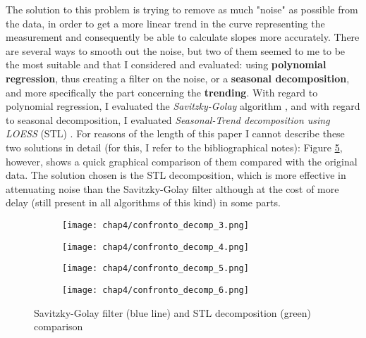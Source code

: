 The solution to this problem is trying to remove as much "noise" as possible from the data, in order to get a more linear trend in the curve representing the measurement and consequently be able to calculate slopes more accurately.\newline
There are several ways to smooth out the noise, but two of them seemed to me to be the most suitable and that I considered and evaluated: using \textbf{polynomial regression}, thus creating a filter on the noise, or a \textbf{seasonal decomposition}, and more specifically the part concerning the \textbf{trending}.\newline
With regard to polynomial regression, I evaluated the \textit{Savitzky-Golay} algorithm \cite{savgol}, and with regard to seasonal decomposition, I evaluated \textit{Seasonal-Trend decomposition using LOESS} (STL) \cite{stl_decomp}.\newline
For reasons of the length of this paper I cannot describe these two solutions in detail (for this, I refer to the bibliographical notes): Figure \ref{fig:4_smoothing_comparison}, however, shows a quick graphical comparison of them compared with the original data. The solution chosen is the STL decomposition, which is more effective in attenuating noise than the Savitzky-Golay filter although at the cost of more delay (still present in all algorithms of this kind) in some parts.

\begin{figure}[H]
	\centering
	\begin{subfigure}{0.48\textwidth}
		\texttt{[image: chap4/confronto\_decomp\_3.png]}
		\caption{}
		\label{subfig:4_smoothing1}
	\end{subfigure}
	\hfill
	\begin{subfigure}{0.48\textwidth}
		\texttt{[image: chap4/confronto\_decomp\_4.png]}
		\caption{}
		\label{subfig:4_smoothing2}
	\end{subfigure}
	\begin{subfigure}{0.48\textwidth}
		\texttt{[image: chap4/confronto\_decomp\_5.png]}
		\caption{}
		\label{subfig:4_smoothing3}
	\end{subfigure}
	\begin{subfigure}{0.48\textwidth}
		\texttt{[image: chap4/confronto\_decomp\_6.png]}
		\caption{}
		\label{subfig:4_smoothing4}
	\end{subfigure}
	\caption{Savitzky-Golay filter (blue line) and STL decomposition (green) comparison}
	\label{fig:4_smoothing_comparison}
\end{figure}

